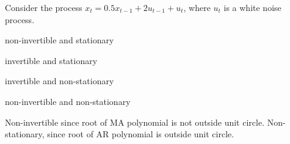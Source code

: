 
\begin{question}
Consider the process \(x_t = 0.5 x_{t−1} + 2 u_{t−1} + u_{t}\), where \(u_t\) is a white noise process.
\begin{answerlist}
  \item non-invertible and stationary
  \item invertible and stationary
  \item invertible and non-stationary
  \item non-invertible and non-stationary
\end{answerlist}
\end{question}

\begin{solution}
Non-invertible since root of MA polynomial is not outside unit circle.
Non-stationary, since root of AR polynomial is outside unit circle.
\end{solution}

